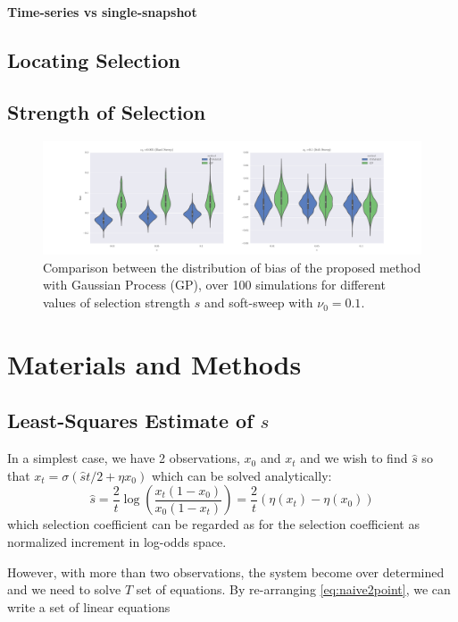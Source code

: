 \documentclass[11pt]{article}
\begin{document}
\paragraph{Time-series vs single-snapshot}

\subsection{Locating Selection}

\subsection{Strength of  Selection}
\begin{figure}
	\centering
	\includegraphics[trim=2.2in 0 2.2in 0, 
	clip,width=\textwidth]{bias}
	\caption{Comparison between the distribution of bias of the proposed method 
	with Gaussian Process (GP), over 100 simulations for different values of 
	selection strength $s$ and soft-sweep with $\nu_0=0.1$.} \label{fig:bias}
\end{figure}

\section{Materials and Methods}
\newpage

\subsection{Least-Squares Estimate of $s$}
In a simplest case, we have 2 observations, $x_0$ and $x_t$ and we wish to find 
$\hat{s}$ so that $x_t=\sigma(\hat{s}t/2+\eta{x_0})$ which can be solved 
analytically:
\begin{equation}
\hat{s}=\frac{2}{t} \log \left( \frac{x_t(1-x_0)}{x_0 (1-x_t)} \right) = 
\frac{2}{t}  \left( \eta(x_t)-\eta(x_0)\right)
\label{eq:naive2point}
\end{equation}
which selection coefficient can be regarded as for the
selection coefficient as normalized increment in log-odds space.

However, with more than two observations, the system become over determined and 
we need to solve $T$ set of equations. By re-arranging 
\eqref{eq:naive2point}, we can write a set of linear equations
\end{document}
